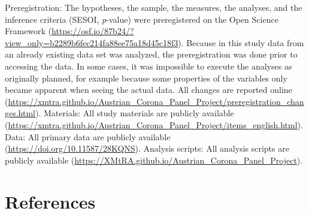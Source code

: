 \documentclass[
  man,mask,floatsintext]{apa7}
\begin{document}
Preregistration: The hypotheses, the sample, the measures, the analyses, and the inference criteria (SESOI, \emph{p}-value) were preregistered on the Open Science Framework (\url{https://osf.io/87b24/?view_only=b2289b6fec214fa88ee75a18d45c18f3}).
Because in this study data from an already existing data set was analyzed, the preregistration was done prior to accessing the data.
In some cases, it was impossible to execute the analyses as originally planned, for example because some properties of the variables only became apparent when seeing the actual data.
All changes are reported online (\url{https://xmtra.github.io/Austrian_Corona_Panel_Project/preregistration_changes.html}).
Materials: All study materials are publicly available (\url{https://xmtra.github.io/Austrian_Corona_Panel_Project/items_english.html}). Data: All primary data are publicly available (\url{https://doi.org/10.11587/28KQNS}). Analysis scripts: All analysis scripts are publicly available (\url{https://XMtRA.github.io/Austrian_Corona_Panel_Project}).

\newpage

\section{References}\label{references}
\end{document}
